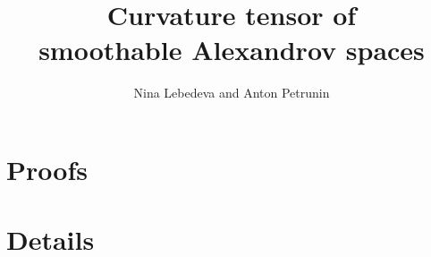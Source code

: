 \documentclass[a4paper,10pt]{article}
\begin{document}
\title{Curvature tensor of\\ smoothable Alexandrov spaces}
\date{}
\author{Nina Lebedeva and Anton Petrunin} 
\maketitle



\tableofcontents




\part{Proofs}











%

%
%
%

\part{Details}



%

{\sloppy
\printbibliography[heading=bibintoc]
\fussy
}
\end{document}

